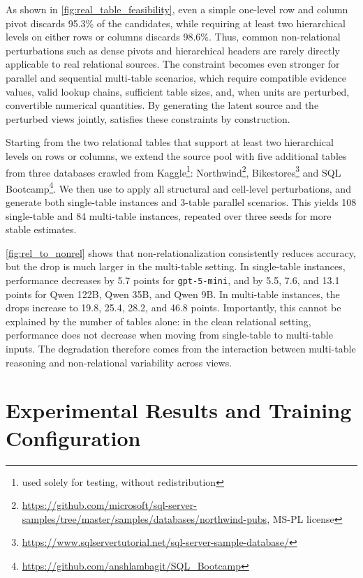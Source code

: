 As shown in \autoref{fig:real_table_feasibility}, even a simple one-level row and column pivot discards 95.3\% of the candidates, while requiring at least two hierarchical levels on either rows or columns discards 98.6\%.
Thus, common non-relational perturbations such as dense pivots and hierarchical headers are rarely directly applicable to real relational sources.
The constraint becomes even stronger for parallel and sequential multi-table scenarios, which require compatible evidence values, valid lookup chains, sufficient table sizes, and, when units are perturbed, convertible numerical quantities.
By generating the latent source and the perturbed views jointly, \name satisfies these constraints by construction.

 Starting from the two relational tables that support at least two hierarchical levels on rows or columns, we extend the source pool with five additional tables from three databases crawled from Kaggle\footnote{used solely for testing, without redistribution}: Northwind\footnote{\url{https://github.com/microsoft/sql-server-samples/tree/master/samples/databases/northwind-pubs}, MS-PL license}, Bikestores\footnote{\url{https://www.sqlservertutorial.net/sql-server-sample-database/}} and SQL Bootcamp\footnote{\url{https://github.com/anshlambagit/SQL_Bootcamp}}.
We then use \name to apply all structural and cell-level perturbations, and generate both single-table instances and 3-table parallel scenarios.
This yields 108 single-table and 84 multi-table instances, repeated over three seeds for more stable estimates.

\autoref{fig:rel_to_nonrel} shows that non-relationalization consistently reduces accuracy, but the drop is much larger in the multi-table setting.
In single-table instances, performance decreases by 5.7 points for \texttt{gpt-5-mini}, and by 5.5, 7.6, and 13.1 points for Qwen 122B, Qwen 35B, and Qwen 9B.
In multi-table instances, the drops increase to 19.8, 25.4, 28.2, and 46.8 points.
Importantly, this cannot be explained by the number of tables alone: in the clean relational setting, performance does not decrease when moving from single-table to multi-table inputs.
The degradation therefore comes from the interaction between multi-table reasoning and non-relational variability across views.

\section{Experimental Results and Training Configuration}
\label{sec:exp_train}

